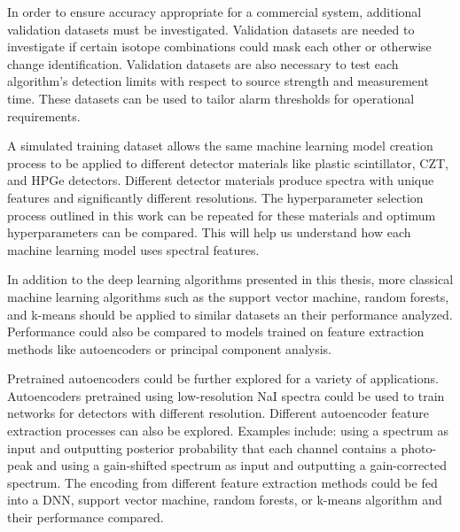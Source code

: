 In order to ensure accuracy appropriate for a commercial system, additional validation datasets must be investigated. Validation datasets are needed to investigate if certain isotope combinations could mask each other or otherwise change identification. Validation datasets are also necessary to test each algorithm's detection limits with respect to source strength and measurement time. These datasets can be used to tailor alarm thresholds for operational requirements. 



A simulated training dataset allows the same machine learning model creation process to be applied to different detector materials like plastic scintillator, CZT, and HPGe detectors. Different detector materials produce spectra with unique features and significantly different resolutions. The hyperparameter selection process outlined in this work can be repeated for these materials and optimum hyperparameters can be compared. This will help us understand how each machine learning model uses spectral features.

In addition to the deep learning algorithms presented in this thesis, more classical machine learning algorithms such as the support vector machine, random forests, and k-means should be applied to similar datasets an their performance analyzed. Performance could also be compared to models trained on feature extraction methods like autoencoders or principal component analysis.

Pretrained autoencoders could be further explored for a variety of applications. Autoencoders pretrained using low-resolution NaI spectra could be used to train networks for detectors with different resolution. Different autoencoder feature extraction processes can also be explored. Examples include: using a spectrum as input and outputting posterior probability that each channel contains a photo-peak and using a gain-shifted spectrum as input and outputting a gain-corrected spectrum. The encoding from different feature extraction methods could be fed into a DNN, support vector machine, random forests, or k-means algorithm and their performance compared.




